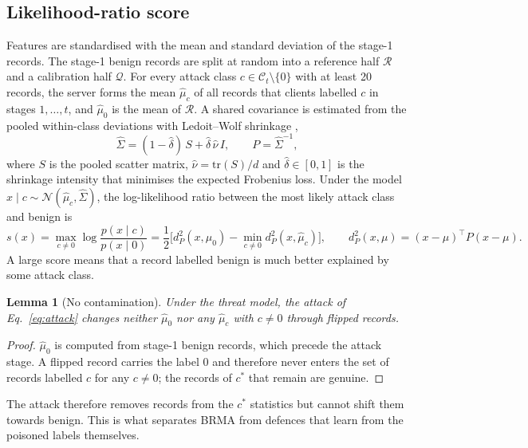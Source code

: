 \documentclass[pdflatex,sn-mathphys-num]{sn-jnl}
\theoremstyle{thmstyleone}
\newtheorem{lemma}{Lemma}
\theoremstyle{thmstylethree}
\begin{document}
\subsection{Likelihood-ratio score}
Features are standardised with the mean and standard deviation of the stage-1 records. The stage-1 benign records are split at random into a reference half $\mathcal{R}$ and a calibration half $\mathcal{Q}$. For every attack class $c\in\mathcal{C}_t\setminus\{0\}$ with at least 20 records, the server forms the mean $\hat\mu_c$ of all records that clients labelled $c$ in stages $1,\dots,t$, and $\hat\mu_0$ is the mean of $\mathcal{R}$. A shared covariance is estimated from the pooled within-class deviations with Ledoit--Wolf shrinkage \cite{ledoit},
\begin{equation}
\hat\Sigma=(1-\hat\delta)\,S+\hat\delta\,\hat\nu\, I,\qquad P=\hat\Sigma^{-1},
\label{eq:lw}
\end{equation}
where $S$ is the pooled scatter matrix, $\hat\nu=\mathrm{tr}(S)/d$ and $\hat\delta\in[0,1]$ is the shrinkage intensity that minimises the expected Frobenius loss. Under the model $x\mid c\sim\mathcal{N}(\hat\mu_c,\hat\Sigma)$, the log-likelihood ratio between the most likely attack class and benign is
\begin{equation}
s(x)=\max_{c\neq 0}\log\frac{p(x\mid c)}{p(x\mid 0)}=\frac{1}{2}\Big[d_P^2(x,\hat\mu_0)-\min_{c\neq 0}d_P^2(x,\hat\mu_c)\Big],\qquad d_P^2(x,\mu)=(x-\mu)^{\top}P(x-\mu).
\label{eq:score}
\end{equation}
A large score means that a record labelled benign is much better explained by some attack class.

\begin{lemma}[No contamination]\label{lem:clean}
Under the threat model, the attack of Eq.~\eqref{eq:attack} changes neither $\hat\mu_0$ nor any $\hat\mu_c$ with $c\neq 0$ through flipped records.
\end{lemma}
\begin{proof}
$\hat\mu_0$ is computed from stage-1 benign records, which precede the attack stage. A flipped record carries the label $0$ and therefore never enters the set of records labelled $c$ for any $c\neq 0$; the records of $c^\ast$ that remain are genuine.
\end{proof}

The attack therefore removes records from the $c^\ast$ statistics but cannot shift them towards benign. This is what separates BRMA from defences that learn from the poisoned labels themselves.
\end{document}
